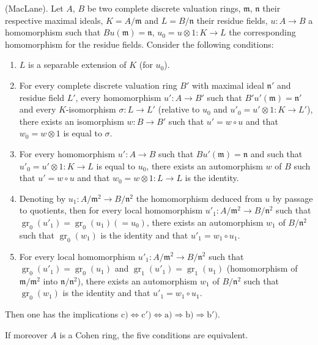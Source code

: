 \begin{proposition}[21.5.2]
\label{0.21.5.2}
\textnormal{(MacLane).}
Let $A$, $B$ be two complete discrete valuation rings, $\mathfrak{m}$, $\mathfrak{n}$ their respective maximal ideals, $K=A/\mathfrak{m}$ and $L=B/\mathfrak{n}$ their residue fields, $u:A\to B$ a homomorphism such that $Bu(\mathfrak{m})=\mathfrak{n}$, $u_0=u\otimes 1:K\to L$ the corresponding homomorphism for the residue fields.
Consider the following conditions:
\begin{enumerate}
  \item[\rm a)] $L$ is a separable extension of $K$ \textup{(}for $u_0$\textup{)}.
  \item[\rm b)] For every complete discrete valuation ring $B'$ with maximal ideal $\mathfrak{n}'$ and residue field $L'$,
    every homomorphism $u':A\to B'$ such that $B'u'(\mathfrak{m})=\mathfrak{n}'$ and every $K$-isomorphism $\sigma:L\to L'$ \textup{(}relative to $u_0$ and $u'_0=u'\otimes 1:K\to L'$\textup{)}, there exists an isomorphism $w:B\to B'$ such that $u'=w\circ u$ and that $w_0=w\otimes 1$ is equal to $\sigma$.
  \item[\rm b$'$)] For every homomorphism $u':A\to B$ such that $Bu'(\mathfrak{m})=\mathfrak{n}$ and such that $u'_0=u'\otimes 1:K\to L$ is equal to $u_0$, there exists an automorphism $w$ of $B$ such that $u'=w\circ u$ and that $w_0=w\otimes 1:L\to L$ is the identity.
  \item[\rm c)] Denoting by $u_1:A/\mathfrak{m}^2\to B/\mathfrak{n}^2$ the homomorphism deduced from $u$ by passage to quotients, then for every local homomorphism $u'_1:A/\mathfrak{m}^2\to B/\mathfrak{n}^2$ such that $\operatorname{gr}_0(u'_1)=\operatorname{gr}_0(u_1)(=u_0)$, there exists an automorphism $w_1$ of $B/\mathfrak{n}^2$ such that $\operatorname{gr}_0(w_1)$ is the identity and that $u'_1=w_1\circ u_1$.
  \item[\rm c$'$)] For every local homomorphism $u'_1:A/\mathfrak{m}^2\to B/\mathfrak{n}^2$ such that $\operatorname{gr}_0(u'_1)=\operatorname{gr}_0(u_1)$ and $\operatorname{gr}_1(u'_1)=\operatorname{gr}_1(u_1)$ \textup{(}homomorphism of $\mathfrak{m}/\mathfrak{m}^2$ into $\mathfrak{n}/\mathfrak{n}^2$\textup{)}, there exists an automorphism $w_1$ of $B/\mathfrak{n}^2$ such that $\operatorname{gr}_0(w_1)$ is the identity and that $u'_1=w_1\circ u_1$.
\end{enumerate}
Then one has the implications $\mathrm{c})\Leftrightarrow\mathrm{c}')\Leftrightarrow\mathrm{a})\Rightarrow\mathrm{b})\Rightarrow\mathrm{b}')$.

If moreover $A$ is a Cohen ring, the five conditions are equivalent.
\end{proposition}

